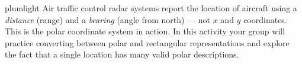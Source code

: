 \documentclass[10pt]{article}
\begin{document}
\namepartnerperiod

\vspace{0.10in}

\begin{scenariobox}{plumlight}
Air traffic control radar systems report the location of aircraft using a
\emph{distance} (range) and a \emph{bearing} (angle from north) --- not $x$
and $y$ coordinates. This is the polar coordinate system in action. In this
activity your group will practice converting between polar and rectangular
representations and explore the fact that a single location has many valid
polar descriptions.
\end{scenariobox}

\vspace{0.08in}
\end{document}
